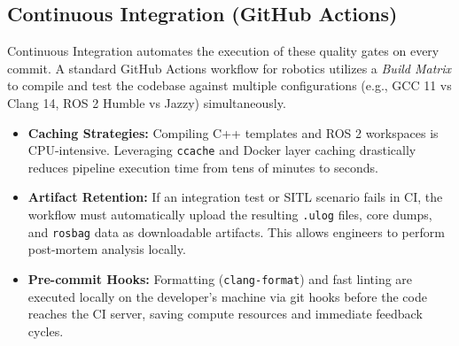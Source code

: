 \documentclass{article}
\begin{document}
\subsection{Continuous Integration (GitHub Actions)}
Continuous Integration automates the execution of these quality gates on every commit. A standard GitHub Actions workflow for robotics utilizes a \textit{Build Matrix} to compile and test the codebase against multiple configurations (e.g., GCC 11 vs Clang 14, ROS 2 Humble vs Jazzy) simultaneously. 

\begin{itemize}
    \item \textbf{Caching Strategies:} Compiling C++ templates and ROS 2 workspaces is CPU-intensive. Leveraging \texttt{ccache} and Docker layer caching drastically reduces pipeline execution time from tens of minutes to seconds.
    \item \textbf{Artifact Retention:} If an integration test or SITL scenario fails in CI, the workflow must automatically upload the resulting \texttt{.ulog} files, core dumps, and \texttt{rosbag} data as downloadable artifacts. This allows engineers to perform post-mortem analysis locally.
    \item \textbf{Pre-commit Hooks:} Formatting (\texttt{clang-format}) and fast linting are executed locally on the developer's machine via git hooks before the code reaches the CI server, saving compute resources and immediate feedback cycles.
\end{itemize}
\end{document}
